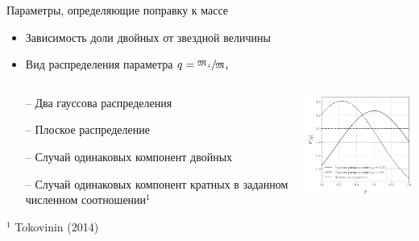 \documentclass[pdf]{beamer}
\begin{document}
	\begin{frame}{Параметры, определяющие поправку к массе}
		\begin{itemize}
			\item Зависимость доли двойных от звездной величины
			\item Вид распределения параметра $ q = \sfrac{\mathfrak{M_2}}{\mathfrak{M_1}} $
		\end{itemize}
		\pause

		\begin{columns}
			\begin{column}{0.47\textwidth}
			\begin{itemize}
				\item[--] Два гауссова распределения
				\item[--] Плоское распределение
				\item[--] Случай одинаковых компонент двойных
				\item[--] Случай одинаковых компонент кратных в  заданном численном соотношении$^1$
				
			\end{itemize}	
			\hspace{0.2cm}	
			{\footnotesize $^1$ Tokovinin (2014)}
			\end{column}
			
			\begin{column}{0.5\textwidth}
				
				\includegraphics[width=5cm]{images/q_dists.pdf}
			\end{column}
		\end{columns}
		\vspace{-0.5cm}

	\end{frame}
	
\end{document}

